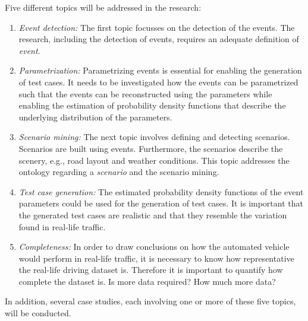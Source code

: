 \documentclass[10pt,final,a4paper,oneside,onecolumn]{article}
\begin{document}
Five different topics will be addressed in the research:
\begin{enumerate}
	\item \emph{Event detection:}\,\,The first topic focusses on the detection of the events. The research, including the detection of events, requires an adequate definition of \emph{event}.
	\item \emph{Parametrization:}\,\,Parametrizing events is essential for enabling the generation of test cases. It needs to be investigated how the events can be parametrized such that the events can be reconstructed using the parameters while enabling the estimation of probability density functions that describe the underlying distribution of the parameters.
	\item \emph{Scenario mining:}\,\,The next topic involves defining and detecting scenarios. Scenarios are built using events. Furthermore, the scenarios describe the scenery, e.g., road layout and weather conditions. This topic addresses the ontology regarding a \emph{scenario} and the scenario mining.
	\item \emph{Test case generation:}\,\,The estimated probability density functions of the event parameters could be used for the generation of test cases. It is important that the generated test cases are realistic and that they resemble the variation found in real-life traffic.
	\item \emph{Completeness:}\,\,In order to draw conclusions on how the automated vehicle would perform in real-life traffic, it is necessary to know how representative the real-life driving dataset is. Therefore it is important to quantify how complete the dataset is. Is more data required? How much more data?
\end{enumerate}

In addition, several case studies, each involving one or more of these five topics, will be conducted.
\end{document}
